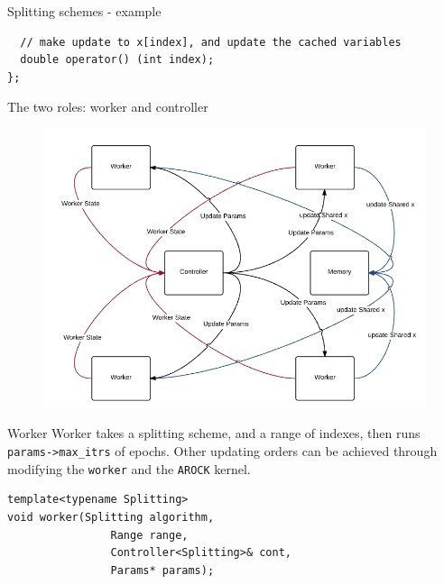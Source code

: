 \documentclass[hyperref,handout,compress,9pt,mathserif]{beamer}
\begin{document}
\begin{frame}[fragile]{Splitting schemes - example}
\begin{small}
\begin{lstlisting}
  // make update to x[index], and update the cached variables                                                                                                                                                                                   
  double operator() (int index);                                                                                                                                          
};                                                                                                                                                                                   
\end{lstlisting}
\end{small}

\end{frame}


\begin{frame}{The two roles: worker and controller}
\begin{figure}[!h]
        \centering
                \includegraphics[width=.95\textwidth]{./figs/shared_arch.png}
\end{figure}
\end{frame}

\begin{frame}[fragile]{Worker}
Worker takes a splitting scheme, and a range of indexes, then runs \texttt{params->max\_itrs} of epochs. Other updating orders can be achieved through modifying the \texttt{worker} and the \texttt{AROCK} kernel.
\begin{lstlisting}
template<typename Splitting>
void worker(Splitting algorithm, 
	            Range range, 
	            Controller<Splitting>& cont, 
	            Params* params);
\end{lstlisting}

\end{frame}
\end{document}
